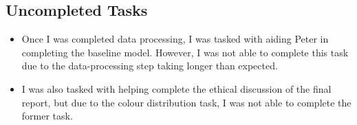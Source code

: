 \documentclass{article} %
\begin{document}
\subsection{Uncompleted Tasks}

\begin{itemize}
    \item Once I was completed data processing, I was tasked with aiding Peter in completing the baseline model. However, I was not able to complete this task due to the data-processing step taking longer than expected. 
    \item I was also tasked with helping complete the ethical discussion of the final report, but due to the colour distribution task, I was not able to complete the former task. 
\end{itemize}

\label{last_page}
\end{document}
